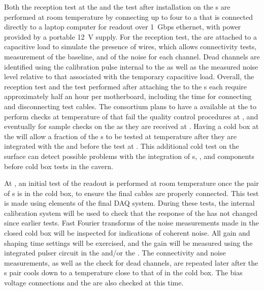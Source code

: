 Both the reception test at the  and the test after 
installation on the s are performed at room temperature 
by connecting up to four  to a  that is 
connected directly to a laptop computer for readout over 1~Gbps
ethernet, with power provided by a portable 12~V supply. For 
the reception test, the  are attached to a capacitive 
load to simulate the presence of wires, which allows connectivity 
tests, measurement of the baseline, and \rms of the noise for 
each channel. Dead channels are identified using the calibration 
pulse internal to the   as well as the measured
noise level relative to that associated with the temporary capacitive load.
Overall, the reception test and the test performed after attaching the
 to the s each require approximately half an hour per
motherboard, including  the time for connecting and disconnecting test cables.
The  consortium plans to have a  available
at the  to perform checks at \lntwo temperature
of  that fail the quality control procedures at ,
and eventually for sample checks on the  as they are received
at . Having a cold box at the 
will allow a fraction of the s to be tested at
\lntwo temperature after they are integrated with the 
and  before the test at 
. This additional cold test on the surface can
detect possible problems with the integration of s, ,
and  components before cold
box tests in the  cavern.

At , an initial test of the readout is performed at room temperature
once the pair of s is in the cold box, to ensure the final cables are
properly connected. This test is made using elements of the final DAQ system.  During
these tests, the internal calibration system will be used to check that the response
of the  has not changed since earlier tests. Fast Fourier transforms of
the noise measurements made in the closed cold box will be inspected for indications
of coherent noise. All  gain and shaping time settings will be exercised,
and the gain will be measured using the integrated pulser circuit in the 
 and/or the . The connectivity and noise measurements, as well
as the check for dead channels, are repeated later after the s pair cools
down to a temperature close to that of \lntwo in the cold box. The bias voltage
connections and the  are also checked at this time.

